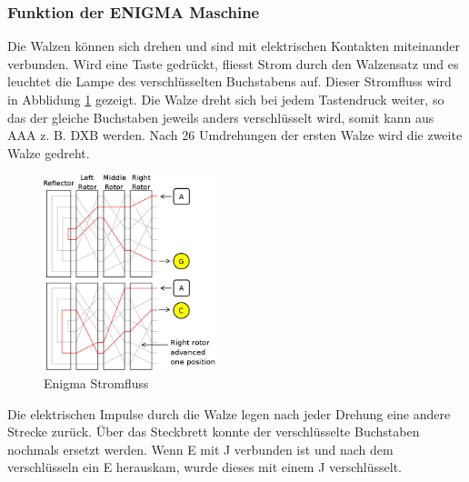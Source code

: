 \subsubsection{Funktion der ENIGMA Maschine}
Die Walzen können sich drehen und sind mit elektrischen Kontakten miteinander verbunden. Wird eine Taste gedrückt, fliesst Strom durch den Walzensatz und es leuchtet die Lampe des verschlüsselten Buchstabens auf. Dieser Stromfluss wird in Abblidung \ref{fig:stromfluss} gezeigt. Die Walze dreht sich bei jedem Tastendruck weiter, so das der gleiche Buchstaben jeweils anders verschlüsselt wird, somit kann aus AAA z. B. DXB werden. Nach 26 Umdrehungen der ersten Walze wird die zweite Walze gedreht. \\
%
\begin{figure}[ht]
\begin{center}
\includegraphics[width=5cm]{images/Enigma-action.png}
\caption{Enigma Stromfluss}
\label{fig:stromfluss}
\end{center}
\end{figure}
%
Die elektrischen Impulse durch die Walze legen nach jeder Drehung eine andere Strecke zurück. 
Über das Steckbrett konnte der verschlüsselte Buchstaben nochmals ersetzt werden. Wenn E mit J verbunden ist und nach dem verschlüsseln ein E herauskam, wurde dieses mit einem J verschlüsselt. 
%
